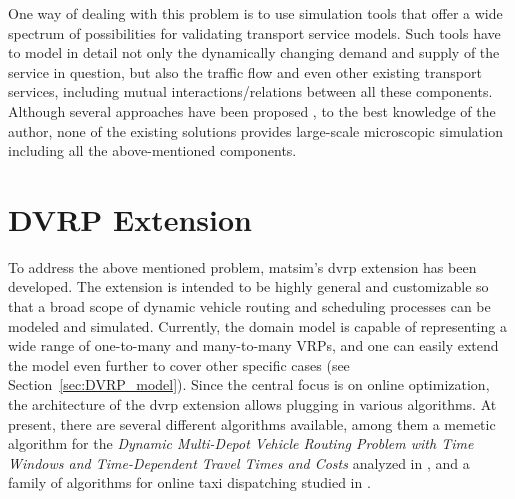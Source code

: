 One way of dealing with this problem is to use simulation tools that offer a wide spectrum of possibilities for validating transport service models. Such tools have to model in detail not only the dynamically changing demand and supply of the service in question, but also the traffic flow and even other existing transport services, including mutual interactions/relations between all these components. Although several approaches have been proposed \citep[e.g.,][]{ReganMahmassaniJaillet1998DynamicFleetManagementSimulation, BarceloEtc2007RoutingSchedulingSimulationLogistics, LiaoEtc2008ObjOrFramework4DVRP,Certicky:2014:AST:2615731.2616118}, to the best knowledge of the author, none of the existing solutions provides large-scale microscopic simulation including all the above-mentioned components.

\section{DVRP Extension}
To address the above mentioned problem, \gls{matsim}'s \gls{dvrp} \gls{extension} has been developed. The \gls{extension} is intended to be highly general and customizable so that a broad scope of dynamic vehicle routing and scheduling processes can be modeled and simulated. Currently, the domain model is capable of representing a wide range of one-to-many and many-to-many VRPs, and one can easily extend the model even further to cover other specific cases (see Section~\ref{sec:DVRP_model}). Since the central focus is on online optimization, the architecture of the \gls{dvrp} extension allows plugging in various algorithms. At present, there are several different algorithms available, among them a memetic  algorithm for the \emph{Dynamic Multi-Depot Vehicle Routing Problem with Time Windows and Time-Dependent Travel Times and Costs} analyzed in \citep{MaciejewskiNagel2012OfflineDVRPMATSimPPAM}, and a family of algorithms for online taxi dispatching studied in \citep{ MaciejewskiNagel2013TaxiSimulation, MaciejewskiNagel2013OnlineTaxisVSPWP, MaciejewskiNagel2013CooperationTaxiDispatching, Maciejewski2014OnlineViaOffline}.

